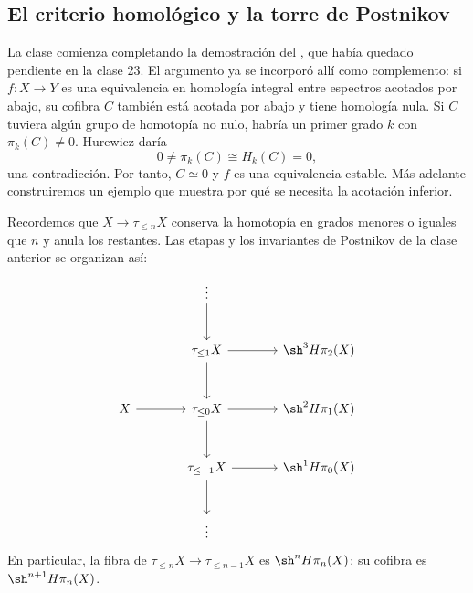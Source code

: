 \subsection{El criterio homológico y la torre de Postnikov}
La clase comienza completando la demostración del , que había quedado pendiente en la clase 23. El argumento ya se incorporó allí como complemento: si $f\colon X\to Y$ es una equivalencia en homología integral entre espectros acotados por abajo, su cofibra $C$ también está acotada por abajo y tiene homología nula. Si $C$ tuviera algún grupo de homotopía no nulo, habría un primer grado $k$ con $\pi_k(C)\ne0$. Hurewicz daría
\[
0\ne\pi_k(C)\cong H_k(C)=0,
\]
una contradicción. Por tanto, $C\simeq0$ y $f$ es una equivalencia estable. Más adelante construiremos un ejemplo que muestra por qué se necesita la acotación inferior.

Recordemos que $X\to\tau_{\leq n}X$ conserva la homotopía en grados menores o iguales que $n$ y anula los restantes. Las etapas y los invariantes de Postnikov de la clase anterior se organizan así:
\[
\begin{tikzcd}[column sep=large,row sep=large]
&\vdots\arrow[d]&\\
&\tau_{\leq1}X\arrow[d]\arrow[r]&\sh^3H\pi_2(X)\\
X\arrow[r]&\tau_{\leq0}X\arrow[d]\arrow[r]&\sh^2H\pi_1(X)\\
&\tau_{\leq-1}X\arrow[d]\arrow[r]&\sh^1H\pi_0(X)\\
&\vdots&
\end{tikzcd}
\]
En particular, la fibra de $\tau_{\leq n}X\to\tau_{\leq n-1}X$ es $\sh^nH\pi_n(X)$; su cofibra es $\sh^{n+1}H\pi_n(X)$.

